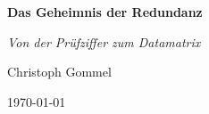 \documentclass[
  11pt,
  a4paper,
  twoside,
  parskip=half,
  numbers=noenddot,
  open=right,
]{scrbook}
\begin{document}
\frontmatter
\pagestyle{plain}

\begin{titlepage}
  \centering
  \vspace*{5cm}
  {\Huge\bfseries Das Geheimnis der Redundanz\par}
  \vspace{1.2cm}
  {\Large\itshape Von der Prüfziffer zum Datamatrix\par}
  \vfill
  {\large Christoph Gommel\par}
  \vspace{0.4cm}
  {\large \today\par}
  \vspace*{1.5cm}
\end{titlepage}


\tableofcontents

\mainmatter
\pagestyle{scrheadings}










\appendix


\glsaddall
\printglossary[title=Glossar, toctitle=Glossar]

\printindex
\end{document}
